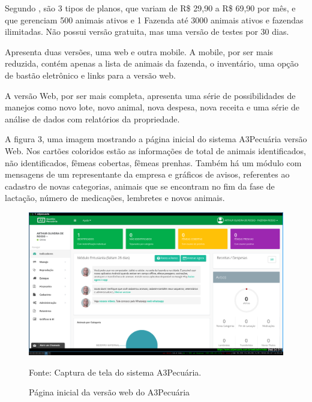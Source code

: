 Segundo , são 3 tipos de planos, que variam de R\$ 29,90 a R\$ 69,90 por mês, e que gerenciam 500 animais ativos e 1 Fazenda até 3000 animais ativos e fazendas ilimitadas. Não possui versão gratuita, mas uma versão de testes por 30 dias.

Apresenta duas versões, uma web e outra mobile. A mobile, por ser mais reduzida, contém apenas a lista de animais da fazenda, o inventário, uma opção de bastão eletrônico e links para a versão web.

A versão Web, por ser mais completa, apresenta uma série de possibilidades de manejos como novo lote, novo animal, nova despesa, nova receita e uma série de análise de dados com relatórios da propriedade.

A figura 3, uma imagem mostrando a página inicial do sistema A3Pecuária versão Web. Nos cartões coloridos estão as informações de total de animais identificados, não identificados, fêmeas cobertas, fêmeas prenhas. Também há um módulo com mensagens de um representante da empresa e gráficos de avisos, referentes ao cadastro de novas categorias, animais que se encontram no fim da fase de lactação, número de medicações, lembretes e novos animais.


\begin{figure}[H]
	\begin{center}
		\caption{Página inicial da versão web do A3Pecuária}
		\includegraphics[width=\textwidth]{../img/a3pecuaria.png}

		Fonte: Captura de tela do sistema A3Pecuária.
	\end{center}
\end{figure}


